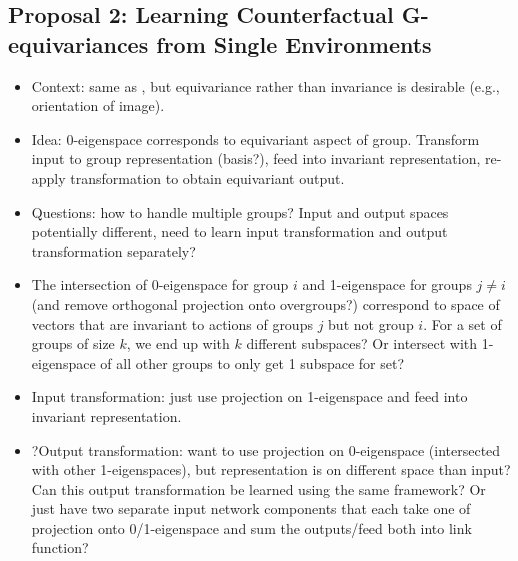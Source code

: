 \subsection{Proposal 2: Learning Counterfactual G-equivariances from Single Environments}

\begin{itemize}

\item
Context: same as \parencite{Mouli:2021}, but equivariance rather than invariance is desirable (e.g., orientation of image).

\item
Idea: 0-eigenspace corresponds to equivariant aspect of group. Transform input to group representation (basis?), feed into invariant representation, re-apply transformation to obtain equivariant output.

\item
Questions: how to handle multiple groups? Input and output spaces potentially different, need to learn input transformation and output transformation separately?

\item
The intersection of 0-eigenspace for group $i$ and 1-eigenspace for groups $j\neq i$ (and remove orthogonal projection onto overgroups?) correspond to space of vectors that are invariant to actions of groups $j$ but not group $i$. For a set of groups of size $k$, we end up with $k$ different subspaces? Or intersect with 1-eigenspace of all other groups to only get 1 subspace for set?

\item
Input transformation: just use projection on 1-eigenspace and feed into invariant representation.

\item
?Output transformation: want to use projection on 0-eigenspace (intersected with other 1-eigenspaces), but representation is on different space than input? Can this output transformation be learned using the same framework? Or just have two separate input network components that each take one of projection onto 0/1-eigenspace and sum the outputs/feed both into link function?

\end{itemize}



